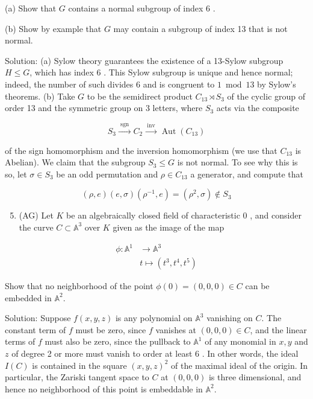 \documentclass[10pt]{article}
\begin{document}
(a) Show that $G$ contains a normal subgroup of index 6 .

(b) Show by example that $G$ may contain a subgroup of index 13 that is not normal.

Solution: (a) Sylow theory guarantees the existence of a 13-Sylow subgroup $H \leq G$, which has index 6 . This Sylow subgroup is unique and hence normal; indeed, the number of such divides 6 and is congruent to $1 \bmod 13$ by Sylow's theorems. (b) Take $G$ to be the semidirect product $C_{13} \rtimes S_{3}$ of the cyclic group of order 13 and the symmetric group on 3 letters, where $S_{3}$ acts via the composite

$$
S_{3} \stackrel{\text { sgn }}{\longrightarrow} C_{2} \stackrel{\text { inv }}{\longrightarrow} \operatorname{Aut}\left(C_{13}\right)
$$

of the sign homomorphism and the inversion homomorphism (we use that $C_{13}$ is Abelian). We claim that the subgroup $S_{3} \leq G$ is not normal. To see why this is so, let $\sigma \in S_{3}$ be an odd permutation and $\rho \in C_{13}$ a generator, and compute that

$$
(\rho, e)(e, \sigma)\left(\rho^{-1}, e\right)=\left(\rho^{2}, \sigma\right) \notin S_{3}
$$

\begin{enumerate}
  \setcounter{enumi}{4}
  \item (AG) Let $K$ be an algebraically closed field of characteristic 0 , and consider the curve $C \subset \mathbb{A}^{3}$ over $K$ given as the image of the map
\end{enumerate}

$$
\begin{aligned}
\phi: \mathbb{A}^{1} & \rightarrow \mathbb{A}^{3} \\
& t \mapsto\left(t^{3}, t^{4}, t^{5}\right)
\end{aligned}
$$

Show that no neighborhood of the point $\phi(0)=(0,0,0) \in C$ can be embedded in $\mathbb{A}^{2}$.

Solution: Suppose $f(x, y, z)$ is any polynomial on $\mathbb{A}^{3}$ vanishing on $C$. The constant term of $f$ must be zero, since $f$ vanishes at $(0,0,0) \in C$, and the linear terms of $f$ must also be zero, since the pullback to $\mathbb{A}^{1}$ of any monomial in $x, y$ and $z$ of degree 2 or more must vanish to order at least 6 . In other words, the ideal $I(C)$ is contained in the square $(x, y, z)^{2}$ of the maximal ideal of the origin. In particular, the Zariski tangent space to $C$ at $(0,0,0)$ is three dimensional, and hence no neighborhood of this point is embeddable in $\mathbb{A}^{2}$.
\end{document}
